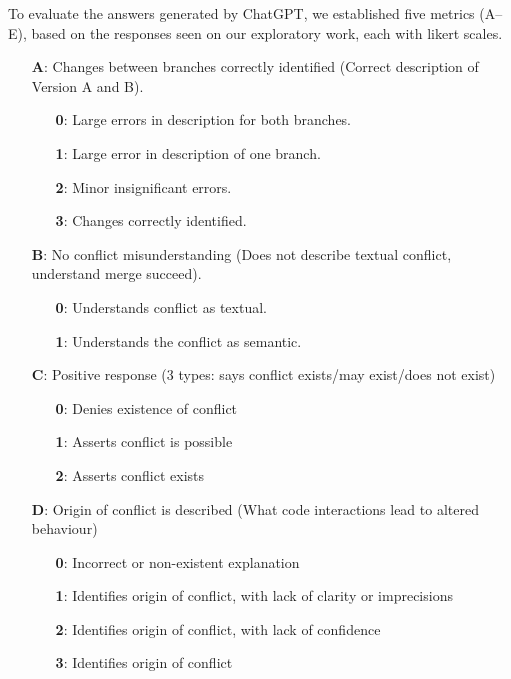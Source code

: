 To evaluate the answers generated by ChatGPT, we established five metrics (A--E), based on the responses seen on our exploratory work, each with likert scales.
%
\begin{itemize}
  \item[\textbf{A}:] Changes between branches correctly identified (Correct description of Version A and B).
  \begin{itemize}
    \item[\textbf{0}:] Large errors in description for both branches.
    \item[\textbf{1}:] Large error in description of one branch.
    \item[\textbf{2}:] Minor insignificant errors.
    \item[\textbf{3}:] Changes correctly identified.
  \end{itemize}

  \item[\textbf{B}:] No conflict misunderstanding (Does not describe textual conflict, understand merge succeed).
  \begin{itemize}
    \item[\textbf{0}:] Understands conflict as textual.
    \item[\textbf{1}:] Understands the conflict as semantic.
  \end{itemize}

  \item[\textbf{C}:] Positive response (3 types: says conflict exists/may exist/does not exist)
  \begin{itemize}
    \item[\textbf{0}:] Denies existence of conflict
    \item[\textbf{1}:] Asserts conflict is possible
    \item[\textbf{2}:] Asserts conflict exists
  \end{itemize}

  \item[\textbf{D}:] Origin of conflict is described (What code interactions lead to altered behaviour)
  \begin{itemize}
    \item[\textbf{0}:] Incorrect or non-existent explanation
    \item[\textbf{1}:] Identifies origin of conflict, with lack of clarity or imprecisions
    \item[\textbf{2}:] Identifies origin of conflict, with lack of confidence
    \item[\textbf{3}:] Identifies origin of conflict
  \end{itemize}


\end{itemize}
